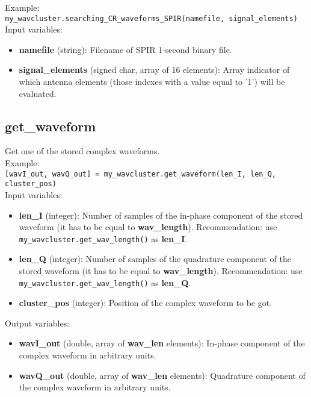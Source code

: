 Example:\\

\texttt{my\_wavcluster.searching\_CR\_waveforms\_SPIR(namefile, signal\_elements)}\\

Input variables:
\begin{itemize}
\item {\bf namefile} (string): Filename of SPIR 1-second binary file.
\item {\bf signal\_elements} (signed char, array of 16 elements): Array indicator of which antenna elements (those indexes with a value equal to '1') will be evaluated.
\end{itemize}


\subsection{get\_waveform}

Get one of the stored complex waveforms.\\

Example:\\

\texttt{[wavI\_out, wavQ\_out] = my\_wavcluster.get\_waveform(len\_I, len\_Q, cluster\_pos)}\\

Input variables:
\begin{itemize}
\item {\bf len\_I} (integer): Number of samples of the in-phase component of the stored waveform (it has to be equal to {\bf wav\_length}). Recommendation: use \texttt{my\_wavcluster.get\_wav\_length()} as {\bf len\_I}.
\item {\bf len\_Q} (integer): Number of samples of the quadrature component of the stored waveform (it has to be equal to {\bf wav\_length}). Recommendation: use \texttt{my\_wavcluster.get\_wav\_length()} as {\bf len\_Q}.
\item {\bf cluster\_pos} (integer): Position of the complex waveform to be got.
\end{itemize}

Output variables:
\begin{itemize}
\item {\bf wavI\_out} (double, array of {\bf wav\_len} elements): In-phase component of the complex waveform in arbitrary units.
\item {\bf wavQ\_out} (double, array of {\bf wav\_len} elements): Quadrature component of the complex waveform in arbitrary units.
\end{itemize}


